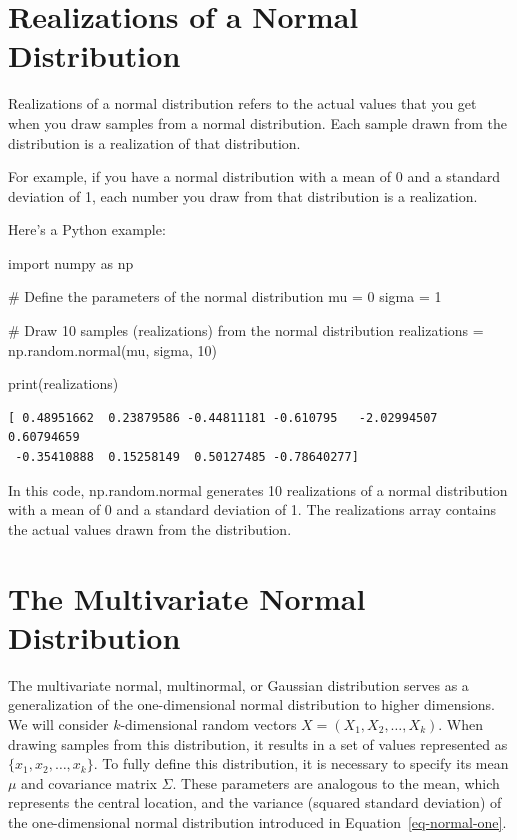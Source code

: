 \documentclass[
  letterpaper,
  DIV=11,
  numbers=noendperiod]{scrreprt}
\newenvironment{Shaded}{\begin{snugshade}}{\end{snugshade}}
\newcommand{\BuiltInTok}[1]{\textcolor[rgb]{0.00,0.23,0.31}{#1}}
\newcommand{\CommentTok}[1]{\textcolor[rgb]{0.37,0.37,0.37}{#1}}
\newcommand{\DecValTok}[1]{\textcolor[rgb]{0.68,0.00,0.00}{#1}}
\newcommand{\ImportTok}[1]{\textcolor[rgb]{0.00,0.46,0.62}{#1}}
\newcommand{\NormalTok}[1]{\textcolor[rgb]{0.00,0.23,0.31}{#1}}
\newcommand{\OperatorTok}[1]{\textcolor[rgb]{0.37,0.37,0.37}{#1}}
\begin{document}
\hypertarget{realizations-of-a-normal-distribution}{%
\section{Realizations of a Normal
Distribution}\label{realizations-of-a-normal-distribution}}

Realizations of a normal distribution refers to the actual values that
you get when you draw samples from a normal distribution. Each sample
drawn from the distribution is a realization of that distribution.

For example, if you have a normal distribution with a mean of 0 and a
standard deviation of 1, each number you draw from that distribution is
a realization.

Here's a Python example:

\begin{Shaded}
\begin{Highlighting}[]
\ImportTok{import}\NormalTok{ numpy }\ImportTok{as}\NormalTok{ np}

\CommentTok{\# Define the parameters of the normal distribution}
\NormalTok{mu }\OperatorTok{=} \DecValTok{0}
\NormalTok{sigma }\OperatorTok{=} \DecValTok{1}

\CommentTok{\# Draw 10 samples (realizations) from the normal distribution}
\NormalTok{realizations }\OperatorTok{=}\NormalTok{ np.random.normal(mu, sigma, }\DecValTok{10}\NormalTok{)}

\BuiltInTok{print}\NormalTok{(realizations)}
\end{Highlighting}
\end{Shaded}

\begin{verbatim}
[ 0.48951662  0.23879586 -0.44811181 -0.610795   -2.02994507  0.60794659
 -0.35410888  0.15258149  0.50127485 -0.78640277]
\end{verbatim}

In this code, np.random.normal generates 10 realizations of a normal
distribution with a mean of 0 and a standard deviation of 1. The
realizations array contains the actual values drawn from the
distribution.

\hypertarget{the-multivariate-normal-distribution}{%
\section{The Multivariate Normal
Distribution}\label{the-multivariate-normal-distribution}}

The multivariate normal, multinormal, or Gaussian distribution serves as
a generalization of the one-dimensional normal distribution to higher
dimensions. We will consider \(k\)-dimensional random vectors
\(X = (X_1, X_2, \ldots, X_k)\). When drawing samples from this
distribution, it results in a set of values represented as
\(\{x_1, x_2, \ldots, x_k\}\). To fully define this distribution, it is
necessary to specify its mean \(\mu\) and covariance matrix \(\Sigma\).
These parameters are analogous to the mean, which represents the central
location, and the variance (squared standard deviation) of the
one-dimensional normal distribution introduced in
Equation~\ref{eq-normal-one}.
\end{document}
